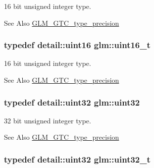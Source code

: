 16 bit unsigned integer type. 

\begin{DoxySeeAlso}{See Also}
\hyperlink{group__gtc__type__precision}{G\-L\-M\-\_\-\-G\-T\-C\-\_\-type\-\_\-precision} 
\end{DoxySeeAlso}
\hypertarget{group__gtc__type__precision_gac4eb4f43cae8129b00086dc234d3b8fc}{
\subsubsection[{uint16\-\_\-t}]{\setlength{\rightskip}{0pt plus 5cm}typedef detail\-::uint16 {\bf glm\-::uint16\-\_\-t}}}\label{group__gtc__type__precision_gac4eb4f43cae8129b00086dc234d3b8fc}


16 bit unsigned integer type. 

\begin{DoxySeeAlso}{See Also}
\hyperlink{group__gtc__type__precision}{G\-L\-M\-\_\-\-G\-T\-C\-\_\-type\-\_\-precision} 
\end{DoxySeeAlso}
\hypertarget{group__gtc__type__precision_ga202b6a53c105fcb7e531f9b443518451}{
\subsubsection[{uint32}]{\setlength{\rightskip}{0pt plus 5cm}typedef detail\-::uint32 {\bf glm\-::uint32}}}\label{group__gtc__type__precision_ga202b6a53c105fcb7e531f9b443518451}


32 bit unsigned integer type. 

\begin{DoxySeeAlso}{See Also}
\hyperlink{group__gtc__type__precision}{G\-L\-M\-\_\-\-G\-T\-C\-\_\-type\-\_\-precision} 
\end{DoxySeeAlso}
\hypertarget{group__gtc__type__precision_ga822ca53a9ad412504532838906276a99}{
\subsubsection[{uint32\-\_\-t}]{\setlength{\rightskip}{0pt plus 5cm}typedef detail\-::uint32 {\bf glm\-::uint32\-\_\-t}}}\label{group__gtc__type__precision_ga822ca53a9ad412504532838906276a99}



